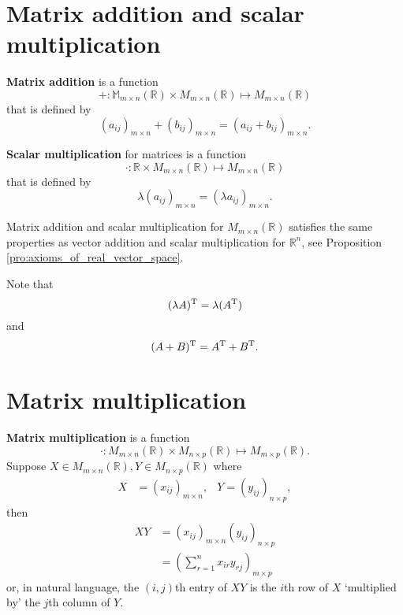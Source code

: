 \section{Matrix addition and scalar multiplication}

\begin{definition}
    \textbf{Matrix addition} is a function \[+:\mathbb M_{m\times n}(\mathbb R)\times M_{m\times n}(\mathbb R)\mapsto M_{m\times n}(\mathbb R)\] that is defined by \[(a_{ij})_{m\times n}+(b_{ij})_{m\times n}=(a_{ij}+b_{ij})_{m\times n}.\]
\end{definition}

\begin{definition}
    \textbf{Scalar multiplication} for matrices is a function \[\cdot:\mathbb R\times M_{m\times n}(\mathbb R)\mapsto M_{m\times n}(\mathbb R)\] that is defined by \[\lambda(a_{ij})_{m\times n}=(\lambda a_{ij})_{m\times n}.\]
\end{definition}

\begin{proposition}
    Matrix addition and scalar multiplication for $M_{m\times n}(\mathbb R)$ satisfies the same properties as vector addition and scalar multiplication for $\mathbb R^n$, see Proposition \ref{pro:axioms_of_real_vector_space}.
\end{proposition}

\begin{remark}
    Note that \[(\lambda A)^{\rm T}=\lambda(A^{\rm T})\] and \[(A+B)^{\rm T}=A^{\rm T}+B^{\rm T}.\]
\end{remark}

\section{Matrix multiplication}

\begin{definition}
    \textbf{Matrix multiplication} is a function \[\cdot:M_{m\times n}(\mathbb R)\times M_{n\times p}(\mathbb R)\mapsto M_{m\times p}(\mathbb R).\] Suppose $X\in M_{m\times n}(\mathbb R),Y\in M_{n\times p}(\mathbb R)$ where
    \begin{align*}
        X&=(x_{ij})_{m\times n},&Y=(y_{ij})_{n\times p},
    \end{align*}
    then
    \begin{align*}
        XY&=(x_{ij})_{m\times n}(y_{ij})_{n\times p}\\
        &=\left(\sum_{r=1}^n{x_{ir}y_{rj}}\right)_{m \times p}
    \end{align*}
    or, in natural language, the $(i,j)$th entry of $XY$ is the $i$th row of $X$ `multiplied by' the $j$th column of $Y$.
\end{definition}

